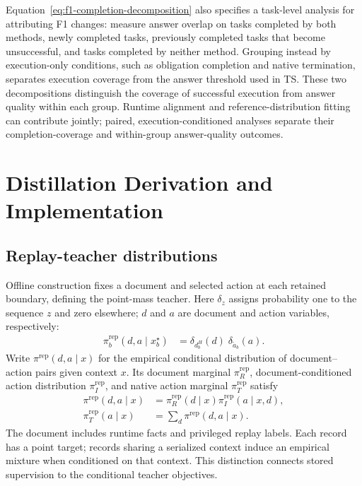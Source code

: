 \documentclass{article}
\begin{document}
Equation~\ref{eq:f1-completion-decomposition} also specifies a task-level
analysis for attributing F1 changes: measure answer overlap on tasks
completed by both methods, newly completed tasks, previously completed tasks
that become unsuccessful, and tasks completed by neither method.
Grouping instead by execution-only conditions, such as obligation completion
and native termination, separates execution coverage from the answer threshold
used in TS. These two decompositions distinguish the coverage of successful
execution from answer quality within each group. Runtime alignment and
reference-distribution fitting can contribute jointly; paired,
execution-conditioned analyses separate their completion-coverage and
within-group answer-quality outcomes.

\FloatBarrier
\section{Distillation Derivation and Implementation}
\label{app:derivation}

\subsection{Replay-teacher distributions}
Offline construction fixes a document and selected action at each retained
boundary, defining the point-mass teacher. Here $\delta_z$ assigns probability
one to the sequence $z$ and zero elsewhere; $d$ and $a$ are document and action
variables, respectively:
\begin{equation}
\begin{aligned}
\pi_b^{\mathrm{rep}}(d,a\mid x_b^\star)
&=\delta_{d_b^H}(d)\;\delta_{\tilde a_b}(a).
\end{aligned}
\label{eq:joint-replay-teacher}
\end{equation}
Write $\pi^{\mathrm{rep}}(d,a\mid x)$ for the empirical conditional
distribution of document--action pairs given context $x$. Its document
marginal $\pi_R^{\mathrm{rep}}$, document-conditioned action distribution
$\pi_I^{\mathrm{rep}}$, and native action marginal $\pi_T^{\mathrm{rep}}$ satisfy
\begin{align}
\pi^{\mathrm{rep}}(d,a\mid x)
&=\pi_R^{\mathrm{rep}}(d\mid x)
  \pi_I^{\mathrm{rep}}(a\mid x,d),\label{eq:teacher-factorization}\\
\pi_T^{\mathrm{rep}}(a\mid x)
&=\sum_d\pi^{\mathrm{rep}}(d,a\mid x).
\label{eq:teacher-marginal}
\end{align}
The document includes runtime facts and privileged replay labels. Each record
has a point target; records sharing a serialized context induce an empirical
mixture when conditioned on that context. This distinction connects stored
supervision to the conditional teacher objectives.
\end{document}
